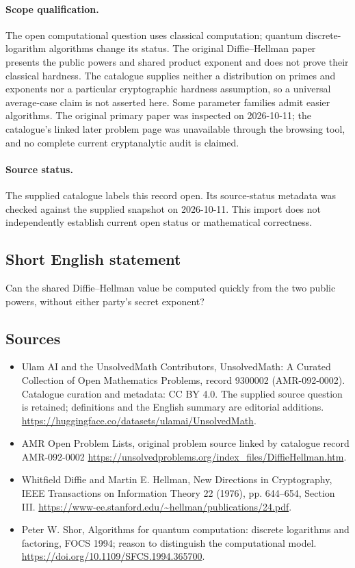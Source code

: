 \documentclass[11pt]{article}
\begin{document}
\paragraph{Scope qualification.}
The open computational question uses classical computation; quantum discrete-logarithm algorithms change its status. The original Diffie--Hellman paper presents the public powers and shared product exponent and does not prove their classical hardness. The catalogue supplies neither a distribution on primes and exponents nor a particular cryptographic hardness assumption, so a universal average-case claim is not asserted here. Some parameter families admit easier algorithms. The original primary paper was inspected on 2026-10-11; the catalogue's linked later problem page was unavailable through the browsing tool, and no complete current cryptanalytic audit is claimed.
\paragraph{Source status.}
The supplied catalogue labels this record open. Its source-status metadata was checked against the supplied snapshot on 2026-10-11. This import does not independently establish current open status or mathematical correctness.
\subsection{Short English statement}
Can the shared Diffie--Hellman value be computed quickly from the two public powers, without either party's secret exponent?
\subsection{Sources}
\begin{itemize}
\item[S1] Ulam AI and the UnsolvedMath Contributors, UnsolvedMath: A Curated Collection of Open Mathematics Problems, record 9300002 (AMR-092-0002). Catalogue curation and metadata: CC BY 4.0. The supplied source question is retained; definitions and the English summary are editorial additions.
\url{https://huggingface.co/datasets/ulamai/UnsolvedMath}.
\item[S2] AMR Open Problem Lists, original problem source linked by catalogue record AMR-092-0002
\url{https://unsolvedproblems.org/index_files/DiffieHellman.htm}.
\item[S3] Whitfield Diffie and Martin E. Hellman, New Directions in Cryptography, IEEE Transactions on Information Theory 22 (1976), pp. 644--654, Section III.
\url{https://www-ee.stanford.edu/~hellman/publications/24.pdf}.
\item[S4] Peter W. Shor, Algorithms for quantum computation: discrete logarithms and factoring, FOCS 1994; reason to distinguish the computational model.
\url{https://doi.org/10.1109/SFCS.1994.365700}.
\end{itemize}
\end{document}
